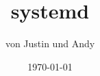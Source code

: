 %
%
%




\title[section77 e.V. - systemd]{systemd} %
      
\author{von Justin und Andy}        %
\date{\today}                 %




\begin{frame}      %
  \titlepage        %
\end{frame}


